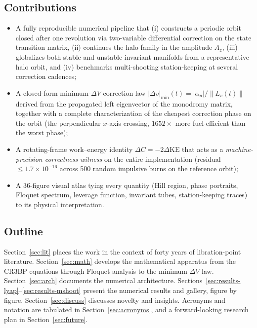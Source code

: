 \documentclass[11pt,a4paper]{article}
\begin{document}
\subsection{Contributions}
\begin{itemize}
  \item A fully reproducible numerical pipeline that (i) constructs a periodic orbit closed after one revolution via two-variable differential correction on the state transition matrix, (ii) continues the halo family in the amplitude $A_z$, (iii) globalizes both stable and unstable invariant manifolds from a representative halo orbit, and (iv) benchmarks multi-shooting station-keeping at several correction cadences;
  \item A closed-form minimum-$\Delta V$ correction law $|\Delta v|_{\min}(t) = |\alpha_u|/\|L_v(t)\|$ derived from the propagated left eigenvector of the monodromy matrix, together with a complete characterization of the cheapest correction phase on the orbit (the perpendicular $x$-axis crossing, $1652\times$ more fuel-efficient than the worst phase);
  \item A rotating-frame work--energy identity $\Delta C = -2\Delta \mathrm{KE}$ that acts as a \emph{machine-precision correctness witness} on the entire implementation (residual $\le 1.7\times 10^{-16}$ across 500 random impulsive burns on the reference orbit);
  \item A 36-figure visual atlas tying every quantity (Hill region, phase portraits, Floquet spectrum, leverage function, invariant tubes, station-keeping traces) to its physical interpretation.
\end{itemize}

\subsection{Outline}
Section~\ref{sec:lit} places the work in the context of forty years of libration-point literature. Section~\ref{sec:math} develops the mathematical apparatus from the CR3BP equations through Floquet analysis to the minimum-$\Delta V$ law. Section~\ref{sec:arch} documents the numerical architecture. Sections~\ref{sec:results-lyap}--\ref{sec:results-mshoot} present the numerical results and gallery, figure by figure. Section~\ref{sec:discuss} discusses novelty and insights. Acronyms and notation are tabulated in Section~\ref{sec:acronyms}, and a forward-looking research plan in Section~\ref{sec:future}.

\end{document}
